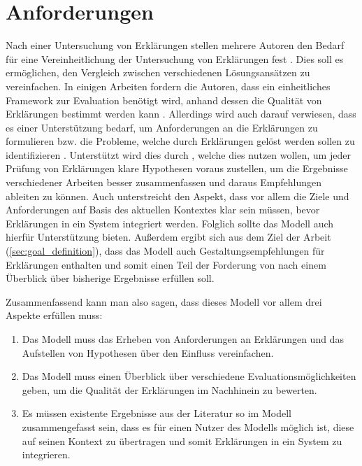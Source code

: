 \section{Anforderungen}

Nach einer Untersuchung von Erklärungen stellen mehrere Autoren den Bedarf für eine Vereinheitlichung der Untersuchung von Erklärungen fest \cite{cirqueira_scenario-based_2020,zahedi_towards_2019, nunes_systematic_2017, martin_evaluating_2021}. Dies soll es ermöglichen, den Vergleich zwischen verschiedenen Lösungsansätzen zu vereinfachen. In einigen Arbeiten fordern die Autoren, dass ein einheitliches Framework zur Evaluation benötigt wird, anhand dessen die Qualität von Erklärungen bestimmt werden kann \cite{nunes_systematic_2017,sokol_explainability_2020,chari_explanation_2020}. Allerdings wird auch darauf verwiesen, dass es einer Unterstützung bedarf, um Anforderungen an die Erklärungen zu formulieren bzw. die Probleme, welche durch Erklärungen gelöst werden sollen zu identifizieren \cite{chazette_end-users_nodate, doshi2017towards}. Unterstützt wird dies durch \citeauthor{waa_evaluating_2021}, welche dies nutzen wollen, um jeder Prüfung von Erklärungen klare Hypothesen voraus zustellen, um die Ergebnisse verschiedener Arbeiten besser zusammenfassen und daraus Empfehlungen ableiten zu können. Auch \citeauthor{kohl_explainability_2019} unterstreicht den Aspekt, dass vor allem die Ziele und Anforderungen auf Basis des aktuellen Kontextes klar sein müssen, bevor Erklärungen in ein System integriert werden. Folglich sollte das Modell auch hierfür Unterstützung bieten. Außerdem ergibt sich aus dem Ziel der Arbeit (\autoref{sec:goal_definition}), dass das Modell auch Gestaltungsempfehlungen für Erklärungen enthalten und somit einen Teil der Forderung von \citeauthor{waa_evaluating_2021} nach einem Überblick über bisherige Ergebnisse erfüllen soll.

Zusammenfassend kann man also sagen, dass dieses Modell vor allem drei Aspekte erfüllen muss:

\begin{enumerate}
    \item Das Modell muss das Erheben von Anforderungen an Erklärungen und das Aufstellen von Hypothesen über den Einfluss vereinfachen.
    \item Das Modell muss einen Überblick über verschiedene Evaluationsmöglichkeiten geben, um die Qualität der Erklärungen im Nachhinein zu bewerten.
    \item Es müssen existente Ergebnisse aus der Literatur so im Modell zusammengefasst sein, dass es für einen Nutzer des Modells möglich ist, diese auf seinen Kontext zu übertragen und somit Erklärungen in ein System zu integrieren.
\end{enumerate}